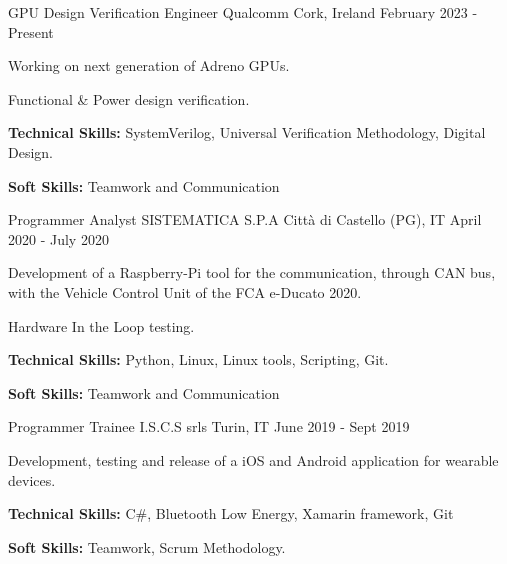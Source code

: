 

\begin{cventries}

  \cventry
    {GPU Design Verification Engineer} %
    {Qualcomm} %
    {Cork, Ireland} %
    {February 2023 - Present} %
    {
      \begin{cvitems} %
        \item {Working on next generation of Adreno GPUs.}
        \item {Functional \& Power design verification.}
        \item {\textbf{Technical Skills:} SystemVerilog, Universal Verification Methodology, Digital Design.}
        \item {\textbf{Soft Skills:} Teamwork and Communication}
      \end{cvitems}
    }

  \cventry
    {Programmer Analyst} %
    {SISTEMATICA S.P.A} %
    {Città di Castello (PG), IT} %
    {April 2020 - July 2020} %
    {
      \begin{cvitems} %
        \item {Development of a Raspberry-Pi tool for the communication, through CAN bus, with the Vehicle Control Unit of the FCA e-Ducato 2020.}
        \item {Hardware In the Loop testing.}
        \item {\textbf{Technical Skills:} Python, Linux, Linux tools, Scripting, Git.}
        \item {\textbf{Soft Skills:} Teamwork and Communication}
      \end{cvitems}
    }

  \cventry
    {Programmer Trainee} %
    {I.S.C.S srls} %
    {Turin, IT} %
    {June 2019 - Sept 2019} %
    {
      \begin{cvitems} %
        \item {Development, testing and release of a iOS and Android application for wearable devices.}
        \item {\textbf{Technical Skills:} C\#, Bluetooth Low Energy, Xamarin framework, Git}
        \item {\textbf{Soft Skills:} Teamwork, Scrum Methodology.}
      \end{cvitems}
    }

\end{cventries}

